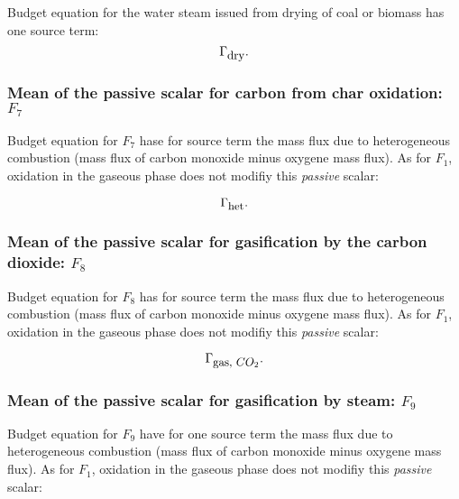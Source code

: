 Budget equation for the water steam issued from drying of coal or biomass has
one source term:
\begin{equation}
    \Gamma_{\mbox{\small dry}}. 
\end{equation} 

                                              
\subsubsection{Mean of the passive scalar for carbon from char oxidation: $F_{7}$}  
  
Budget equation for $F_{7}$ hase for source term the mass flux due to
heterogeneous combustion (mass flux of carbon monoxide minus oxygene mass
flux). As for $F_{1}$, oxidation in the gaseous phase does not modifiy this {\em
  passive} scalar:

\begin{equation}
   \Gamma_{\mbox{\small het}}.
\end{equation}   
         
\subsubsection{Mean of the passive scalar for gasification by the carbon dioxide: $F_{8}$}  
 
 Budget equation for $F_{8}$ has for source term the mass flux due to
 heterogeneous combustion (mass flux of carbon monoxide minus oxygene mass
 flux). As for $F_{1}$, oxidation in the gaseous phase does not modifiy this
 {\em passive} scalar:
  
\begin{equation}
   \Gamma_{\mbox{\small gas, $CO_2$}}.
\end{equation}                         

\subsubsection{Mean of the passive scalar for gasification by steam: $F_{9}$}  
 
 Budget equation for $F_{9}$ have for one source term the mass flux due to
 heterogeneous combustion (mass flux of carbon monoxide minus oxygene mass
 flux). As for $F_{1}$, oxidation in the gaseous phase does not modifiy this
 {\em passive} scalar:
 
